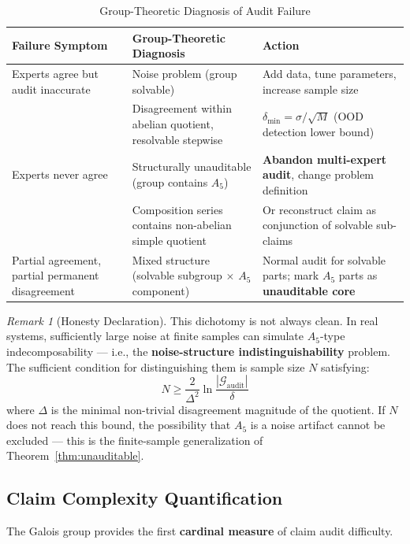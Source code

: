 \documentclass[10pt,a4paper]{article}
\theoremstyle{remark}
\newtheorem{remark}[theorem]{Remark}
\begin{document}
\begin{table}[h]
\centering
\caption{Group-Theoretic Diagnosis of Audit Failure}
\small
\begin{tabular}{@{}p{3.2cm} p{4.5cm} p{4.2cm}@{}}
\toprule
\textbf{Failure Symptom} & \textbf{Group-Theoretic Diagnosis} & \textbf{Action} \\
\midrule
Experts agree but audit inaccurate & Noise problem (group solvable) & Add data, tune parameters, increase sample size \\
 & Disagreement within abelian quotient, resolvable stepwise & $\delta_{\min} = \sigma/\sqrt{M}$ (OOD detection lower bound) \\
\midrule
Experts never agree & Structurally unauditable (group contains $A_5$) & \textbf{Abandon multi-expert audit}, change problem definition \\
 & Composition series contains non-abelian simple quotient & Or reconstruct claim as conjunction of solvable sub-claims \\
\midrule
Partial agreement, partial permanent disagreement & Mixed structure (solvable subgroup $\times$ $A_5$ component) & Normal audit for solvable parts; mark $A_5$ parts as \textbf{unauditable core} \\
\bottomrule
\end{tabular}
\end{table}

\begin{remark}[Honesty Declaration]
This dichotomy is not always clean. In real systems, sufficiently large noise at finite samples can simulate $A_5$-type indecomposability — i.e., the \textbf{noise-structure indistinguishability} problem. The sufficient condition for distinguishing them is sample size $N$ satisfying:
\begin{equation}
N \ge \frac{2}{\Delta^2}\ln\frac{|\mathcal{G}_{\text{audit}}|}{\delta}
\end{equation}
where $\Delta$ is the minimal non-trivial disagreement magnitude of the quotient. If $N$ does not reach this bound, the possibility that $A_5$ is a noise artifact cannot be excluded — this is the finite-sample generalization of Theorem~\ref{thm:unauditable}.
\end{remark}

\subsection{Claim Complexity Quantification}

The Galois group provides the first \textbf{cardinal measure} of claim audit difficulty.
\end{document}
